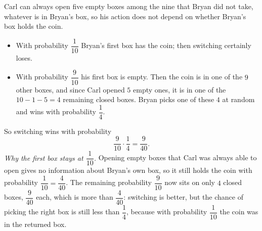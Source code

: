 Carl can always open five empty boxes among the nine that Bryan did not take, whatever is in Bryan's box, so his action does not depend on whether Bryan's box holds the coin.
\begin{itemize}
\item With probability $\dfrac1{10}$ Bryan's first box has the coin; then switching certainly loses.
\item With probability $\dfrac9{10}$ his first box is empty. Then the coin is in one of the $9$ other boxes, and since Carl opened $5$ empty ones, it is in one of the $10-1-5=4$ remaining closed boxes. Bryan picks one of these $4$ at random and wins with probability $\dfrac14$.
\end{itemize}
So switching wins with probability
\[\dfrac9{10}\cdot\dfrac14=\boxed{\dfrac{9}{40}}.\]
\emph{Why the first box stays at $\dfrac1{10}$.} Opening empty boxes that Carl was always able to open gives no information about Bryan's own box, so it still holds the coin with probability $\dfrac1{10}=\dfrac4{40}$. The remaining probability $\dfrac9{10}$ now sits on only $4$ closed boxes, $\dfrac{9}{40}$ each, which is more than $\dfrac4{40}$: switching is better, but the chance of picking the right box is still less than $\dfrac14$, because with probability $\dfrac1{10}$ the coin was in the returned box.
